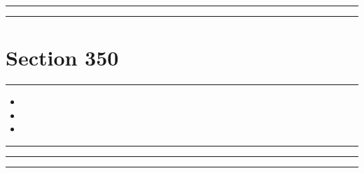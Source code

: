 \documentclass[11pt,a4paper]{article}
\begin{document}
\swarmwrapnext\lipsum[1]\lipsum[2]\lipsum[3]\lipsum[4]\lipsum[5]\lipsum[6]
\begin{swarmwrap}%
  \begin{minipage}[t]{2cm}
    \centering
    \textcolor{red!20}{\rule{\linewidth}{8cm}}
  \end{minipage}%
\end{swarmwrap}%
\swarmwrapnext\lipsum[1]
\begin{swarmwrap}%
  \begin{minipage}[t]{3cm}
    \centering
    \textcolor{red!20}{\rule{\linewidth}{9cm}}
  \end{minipage}%
\end{swarmwrap}%
\swarmwrapnext\lipsum[1]\lipsum[2]
\section{Section 350}
\begin{swarmwrap}%
  \begin{minipage}[t]{4cm}
    \centering
    \textcolor{green!30}{\rule{\linewidth}{10cm}}
  \end{minipage}%
\end{swarmwrap}%
\swarmwrapnext
\begin{itemize}
  \item \lipsum[1][1-3]
  \item \lipsum[2][1-3]
  \item \lipsum[3][1-3]
\end{itemize}
\begin{swarmwrap}%
  \begin{minipage}[t]{5cm}
    \centering
    \textcolor{red!20}{\rule{\linewidth}{2cm}}
  \end{minipage}%
\end{swarmwrap}%
\swarmwrapnext\lipsum[1]\lipsum[2]\lipsum[3]\lipsum[4]
\begin{swarmwrap}%
  \begin{minipage}[t]{2cm}
    \centering
    \textcolor{red!20}{\rule{\linewidth}{3cm}}
  \end{minipage}%
\end{swarmwrap}%
\swarmwrapnext\lipsum[1]\lipsum[2]\lipsum[3]\lipsum[4]\lipsum[5]
\begin{swarmwrap}%
  \begin{minipage}[t]{3cm}
    \centering
    \textcolor{red!20}{\rule{\linewidth}{4cm}}
  \end{minipage}%
\end{swarmwrap}%
\end{document}
